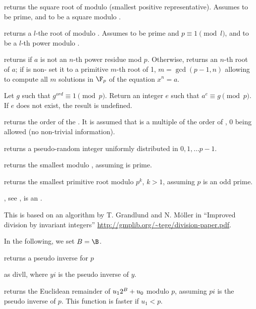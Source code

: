 returns the square root of 
modulo  (smallest positive representative). Assumes  to be
prime, and  to be a square modulo .

 returns a $l$-the root of 
modulo . Assumes  to be prime and $p \equiv 1 \pmod{l}$, and
 to be a $l$-th power modulo .

returns  if $a$ is not an $n$-th power residue mod $p$.
Otherwise, returns an $n$-th root of $a$; if  is non-
set it to a primitive $m$-th root of 1, $m = \gcd(p-1,n)$ allowing to compute
all $m$ solutions in $\F_p$ of the equation $x^n = a$.

 Let $g$ such that
$g^{ord} \equiv 1 \pmod{p}$. Return an integer $e$ such that
$a^e \equiv g \pmod{p}$. If $e$ does not exist, the result is undefined.

 returns the order of the
 . It is assumed that  is a multiple of the order of
, $0$ being allowed (no non-trivial information).

 returns a pseudo-random integer uniformly
distributed in $0, 1, \dots p-1$.

 returns the smallest 
modulo , assuming  is prime.

 returns the smallest primitive root modulo
$p^k$, $k > 1$, assuming $p$ is an odd prime.

, see ,
 is an .


This is based on an algorithm by T. Grandlund and N. M\"{o}ller in
``Improved division by invariant integers''
\url{http://gmplib.org/~tege/division-paper.pdf}.

In the following, we set $B=\B$.

 returns a pseudo inverse  for $p$

as divll, where $yi$ is the pseudo inverse of $y$.

 returns
the Euclidean remainder of $u_1\*2^B+u_0$ modulo $p$, assuming $pi$ is the
pseudo inverse of $p$.  This function is faster if $u_1 < p$.

